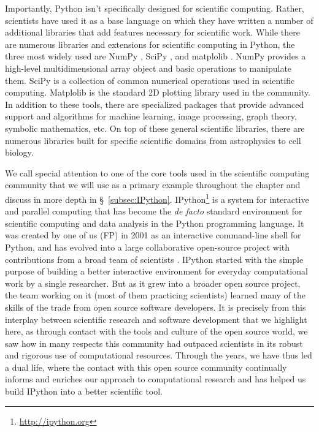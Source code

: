 \documentclass[ChapterTOCs,krantz2]{krantz} %
\begin{document}
Importantly, Python isn't specifically designed for scientific computing.
Rather, scientists have used it as a base language on which they have written a
number of additional libraries that add features necessary for scientific work.
While there are numerous libraries and extensions for scientific computing in
Python, the three most widely used are NumPy \cite{oliphant-numpy}, SciPy
\cite{SciPy}, and matplolib \cite{Hunter:2007, jdh-md:2012}.  NumPy provides a
high-level multidimensional array object and basic operations to manipulate
them. SciPy is a collection of common numerical operations used in scientific
computing. Matplolib is the standard 2D plotting library used in the
community. In addition to these tools, there are specialized packages that
provide advanced support and algorithms for machine learning, image processing,
graph theory, symbolic mathematics, etc. On top of these general scientific
libraries, there are numerous libraries built for specific scientific domains
from astrophysics to cell biology.

We call special attention to one of the core tools used in the scientific
computing community that we will use as a primary example throughout the
chapter and discuss in more depth in §~\ref{subsec:IPython}.
IPython\footnote{\url{http://ipython.org}} is a system for interactive and
parallel computing that has become the \emph{de facto} standard environment for
scientific computing and data analysis in the Python programming language.  It
was created by one of us (FP) in 2001 as an interactive command-line shell for
Python, and has evolved into a large collaborative open-source project with
contributions from a broad team of scientists \cite{PER-GRA:2007}.  IPython
started with the simple purpose of building a better interactive environment
for everyday computational work by a single researcher.  But as it grew into a
broader open source project, the team working on it (most of them practicing
scientists) learned many of the skills of the trade from open source software
developers.  It is precisely from this interplay between scientific research
and software development that we highlight here, as through contact with the
tools and culture of the open source world, we saw how in many respects this
community had outpaced scientists in its robust and rigorous use of
computational resources.  Through the years, we have thus led a dual life,
where the contact with this open source community continually informs and
enriches our approach to computational research and has helped us build IPython
into a better scientific tool.
\end{document}
